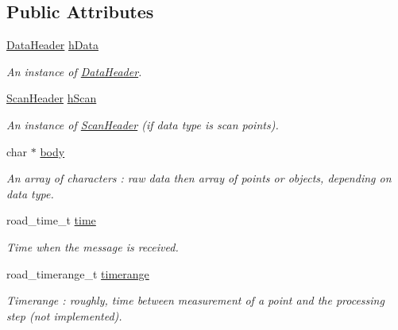 \subsection*{Public Attributes}
\begin{DoxyCompactItemize}
\item 
\hypertarget{classpacpus_1_1Message_a7cd03509930e6ba94ea0e830e1ef1ff2}{\hyperlink{structpacpus_1_1DataHeader}{Data\-Header} \hyperlink{classpacpus_1_1Message_a7cd03509930e6ba94ea0e830e1ef1ff2}{h\-Data}}\label{classpacpus_1_1Message_a7cd03509930e6ba94ea0e830e1ef1ff2}

\begin{DoxyCompactList}\small\item\em An instance of \hyperlink{structpacpus_1_1DataHeader}{Data\-Header}. \end{DoxyCompactList}\item 
\hypertarget{classpacpus_1_1Message_abfbb7f1a5a9165117464f6267f959b8c}{\hyperlink{structpacpus_1_1ScanHeader}{Scan\-Header} \hyperlink{classpacpus_1_1Message_abfbb7f1a5a9165117464f6267f959b8c}{h\-Scan}}\label{classpacpus_1_1Message_abfbb7f1a5a9165117464f6267f959b8c}

\begin{DoxyCompactList}\small\item\em An instance of \hyperlink{structpacpus_1_1ScanHeader}{Scan\-Header} (if data type is scan points). \end{DoxyCompactList}\item 
char $\ast$ \hyperlink{classpacpus_1_1Message_aa6139942cf5b9fb04e9363dc3bf59bb2}{body}
\begin{DoxyCompactList}\small\item\em An array of characters \-: raw data then array of points or objects, depending on data type. \end{DoxyCompactList}\item 
\hypertarget{classpacpus_1_1Message_a24c98ba8213ec96b12ad27838bc7f6d1}{road\-\_\-time\-\_\-t \hyperlink{classpacpus_1_1Message_a24c98ba8213ec96b12ad27838bc7f6d1}{time}}\label{classpacpus_1_1Message_a24c98ba8213ec96b12ad27838bc7f6d1}

\begin{DoxyCompactList}\small\item\em Time when the message is received. \end{DoxyCompactList}\item 
\hypertarget{classpacpus_1_1Message_a6d1c5d1037bbed5ac3b5f72bf6de4963}{road\-\_\-timerange\-\_\-t \hyperlink{classpacpus_1_1Message_a6d1c5d1037bbed5ac3b5f72bf6de4963}{timerange}}\label{classpacpus_1_1Message_a6d1c5d1037bbed5ac3b5f72bf6de4963}

\begin{DoxyCompactList}\small\item\em Timerange \-: roughly, time between measurement of a point and the processing step (not implemented). \end{DoxyCompactList}\end{DoxyCompactItemize}


